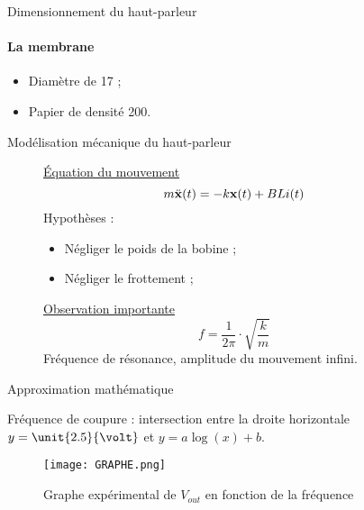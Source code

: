 \documentclass[pdf]{beamer}
\newcommand\fv[1]{{\bf #1}} %
\newcommand\fvdd[1]{\ddot{\bf #1}} %
\begin{document}
\begin{frame}{Dimensionnement du haut-parleur}
	\framesubtitle{La membrane}
		\begin{itemize}
			\item Diamètre de \unit{17}{\centi\meter} ;
			\item Papier de densité \unit{200}{\gram\per\meter\squared}.
		\end{itemize}

\end{frame}

\begin{frame}{Modélisation mécanique du haut-parleur}
	\begin{figure}[ht]
			\underline{Équation du mouvement}
			$$m\fvdd{x}(t) = -k\fv{x}(t) + BLi(t)$$
			Hypothèses : 
				\begin{itemize}
					\item Négliger le poids de la bobine ;
					\item Négliger le frottement ;
				\end{itemize}
		\endminipage\hfill
			\underline{Observation importante}
			$$f = \frac{1}{2\pi} \cdot{\sqrt{\frac{k}{m}}}$$
			Fréquence de résonance, amplitude du mouvement infini.
		\endminipage\hfill
	\end{figure}
\end{frame}

\begin{frame}{Approximation mathématique}

	Fréquence de coupure : intersection entre la droite horizontale $y = 
	\unit{2.5}{\volt}$ et $y = a\log(x) + b$.

	\begin{figure}[ht!]
		\texttt{[image: GRAPHE.png]}
		\caption{Graphe expérimental de $V_{out}$ en fonction de la fréquence}
	\end{figure}
\end{frame}
\end{document}
